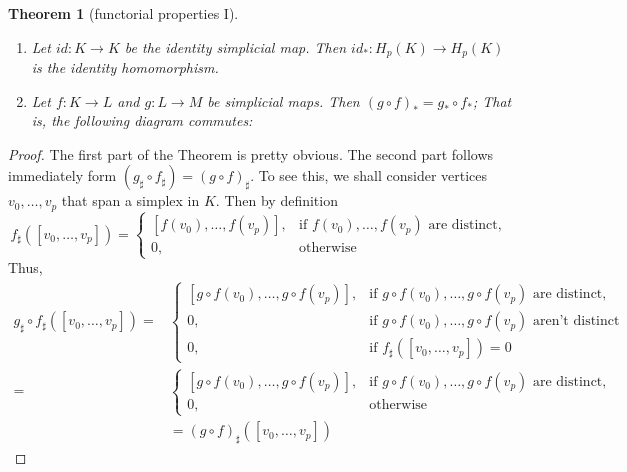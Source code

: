 \documentclass[draft,toc=bib]{scrartcl}
\theoremstyle{plain}
\newtheorem{theorem}{Theorem}[section]
\theoremstyle{definition}
\theoremstyle{remark}
\begin{document}
\begin{theorem}[functorial properties I]\label{func-prop1}\mbox{}
	\begin{enumerate}
		\item Let $id: K\to K$ be the identity simplicial map. Then $id_\ast: H_p(K)\to H_p(K)$ is the identity homomorphism.
		\item Let $f:K\to L$ and $g: L\to M$ be simplicial maps. Then $(g\circ f)_\ast=g_\ast\circ f_\ast$; That is, the following diagram commutes:
		
		\begin{center}
			
	\end{center}
	\end{enumerate}
\end{theorem}



\begin{proof}
	The first part of the Theorem is pretty obvious. The second part follows immediately form $(g_\sharp\circ f_\sharp)=(g\circ f)_\sharp$. To see this, we shall consider vertices $v_0,\dots,v_p$ that span a simplex in $K$.
	Then by definition 
	\[
	f_\sharp([v_0,\dots,v_p])=\begin{cases}
	[f(v_0),\dots,f(v_p)],& \text{if }f(v_0),\dots,f(v_p) \text{ are distinct},\\
	0,& \text{otherwise}
	\end{cases}
	\]
	Thus,
	\begin{align*}
	g_\sharp\circ f_\sharp([v_0,\dots,v_p])=&\begin{cases}
	[g\circ f(v_0),\dots,g\circ f(v_p)],& \text{if }g\circ f(v_0),\dots,g\circ f(v_p) \text{ are distinct},\\
	0,& \text{if }g\circ f(v_0),\dots,g\circ f(v_p) \text{ aren't distinct}\\
	0,& \text{if }f_\sharp([v_0,\dots,v_p])=0
	\end{cases}\\
	=&\begin{cases}
	[g\circ f(v_0),\dots,g\circ f(v_p)],& \text{if }g\circ f(v_0),\dots,g\circ f(v_p) \text{ are distinct},\\
		0,& \text{otherwise}
	\end{cases}\\
	&=(g\circ f)_\sharp([v_0,\dots,v_p])
	\end{align*}
\end{proof}
\end{document}
